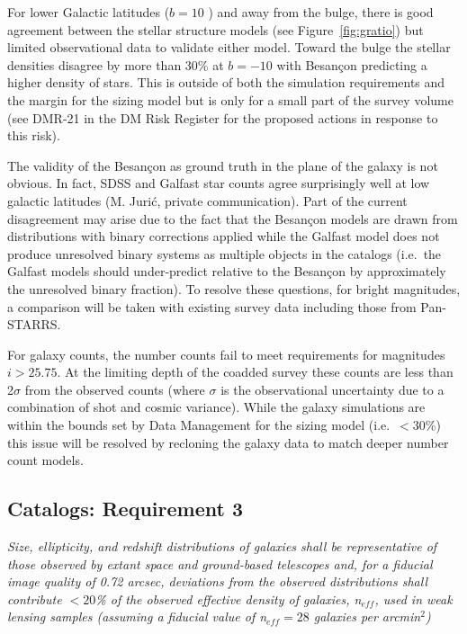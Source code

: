 \documentclass[11pt]{article}
\begin{document}
For lower Galactic latitudes ($b=10$ ) and away from the bulge, there
is good agreement between the stellar structure models (see
Figure~\ref{fig:gratio}) but limited observational data to validate
either model. Toward the bulge the stellar densities disagree by more
than 30\% at $b=-10$ with Besan\c{c}on predicting a higher density of
stars. This is outside of both the simulation requirements and the
margin for the sizing model but is only for a small part of the survey
volume (see DMR-21 in the DM Risk Register for the proposed actions in
response to this risk).  

The validity of the Besan\c{c}on as ground truth in the plane of the
galaxy is not obvious.  In fact, SDSS and Galfast star counts agree
surprisingly well at low galactic latitudes (M. Juri\'{c}, private
communication).  Part of the current disagreement may arise due to the
fact that the Besan\c{c}on models are drawn from distributions with
binary corrections applied while the Galfast model does not produce
unresolved binary systems as multiple objects in the catalogs (i.e.\
the Galfast models should under-predict relative to the Besan\c{c}on
by approximately the unresolved binary fraction).  To resolve these
questions, for bright magnitudes, a comparison will be taken with
existing survey data including those from Pan-STARRS.

For galaxy counts, the number counts fail to meet requirements for
magnitudes $i>25.75$. At the limiting depth of the coadded survey
these counts are less than 2$\sigma$ from the observed counts (where
$\sigma$ is the observational uncertainty due to a combination of shot
and cosmic variance). While the galaxy simulations are within the
bounds set by Data Management for the sizing model (i.e.\ $<30$\%)
this issue will be resolved by recloning the galaxy data to match
deeper number count models.

\subsection{Catalogs:  Requirement 3}

{\it Size, ellipticity, and redshift distributions of galaxies shall
  be representative of those observed by extant space and ground-based
  telescopes and, for a fiducial image quality of 0.72 arcsec,
  deviations from the observed distributions shall contribute $<20$\%
  of the observed effective density of galaxies, n$_{eff}$, used in
  weak lensing samples (assuming a fiducial value of n$_{eff} =
  28$ galaxies per arcmin$^2$)}\\
\end{document}
